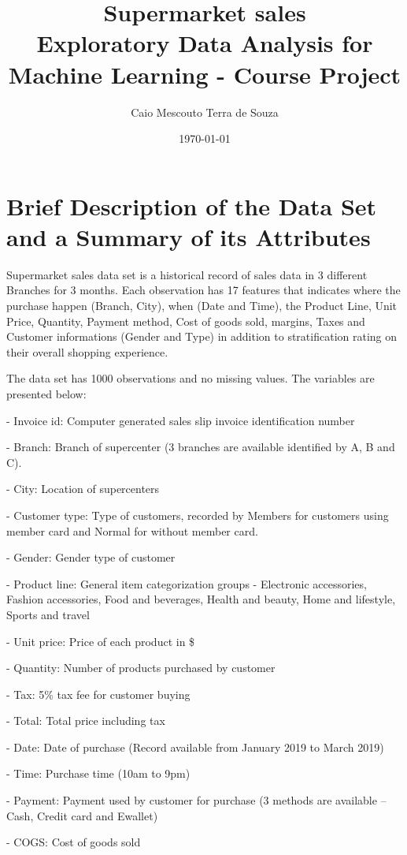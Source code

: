 \documentclass[11pt, a4]{article}
\title{Supermarket sales \\
		\large Exploratory Data Analysis for Machine Learning - Course Project}
\author{Caio Mescouto Terra de Souza}
\date{\today}
\begin{document}
\maketitle

\section*{Brief Description of the Data Set and a Summary of its Attributes}

Supermarket sales data set \cite{sales} is a historical record of sales data in 3 different Branches for 3 months. Each observation has 17 features that indicates where the purchase happen (Branch, City), when (Date and Time), the Product Line, Unit Price, Quantity, Payment method, Cost of goods sold, margins, Taxes and Customer informations (Gender and Type) in addition to stratification rating on their overall shopping experience.

The data set has 1000 observations and no missing values. The variables are presented below:

- Invoice id: Computer generated sales slip invoice identification number

- Branch: Branch of supercenter (3 branches are available identified by A, B and C).

- City: Location of supercenters

- Customer type: Type of customers, recorded by Members for customers using member card and Normal for without member card.

- Gender: Gender type of customer

- Product line: General item categorization groups - Electronic accessories, Fashion accessories, Food and beverages, Health and beauty, Home and lifestyle, Sports and travel

- Unit price: Price of each product in \$

- Quantity: Number of products purchased by customer

- Tax: 5\% tax fee for customer buying

- Total: Total price including tax

- Date: Date of purchase (Record available from January 2019 to March 2019)

- Time: Purchase time (10am to 9pm)

- Payment: Payment used by customer for purchase (3 methods are available – Cash, Credit card and Ewallet)

- COGS: Cost of goods sold
\end{document}
